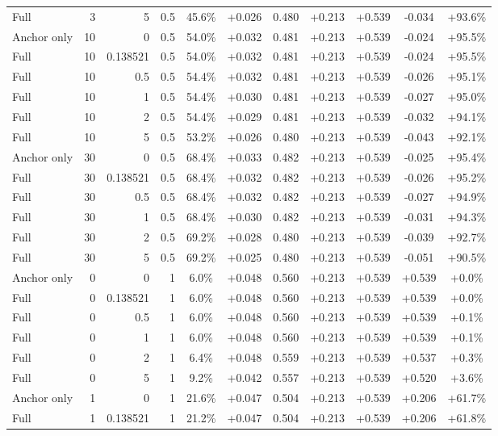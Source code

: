 \begin{table}[htbp]
\begin{tabular}{lrrrccccccc}
Full & 3 & 5 & 0.5 & 45.6\% & +0.026 & 0.480 & +0.213 & +0.539 & -0.034 & +93.6\% \\
Anchor only & 10 & 0 & 0.5 & 54.0\% & +0.032 & 0.481 & +0.213 & +0.539 & -0.024 & +95.5\% \\
Full & 10 & 0.138521 & 0.5 & 54.0\% & +0.032 & 0.481 & +0.213 & +0.539 & -0.024 & +95.5\% \\
Full & 10 & 0.5 & 0.5 & 54.4\% & +0.032 & 0.481 & +0.213 & +0.539 & -0.026 & +95.1\% \\
Full & 10 & 1 & 0.5 & 54.4\% & +0.030 & 0.481 & +0.213 & +0.539 & -0.027 & +95.0\% \\
Full & 10 & 2 & 0.5 & 54.4\% & +0.029 & 0.481 & +0.213 & +0.539 & -0.032 & +94.1\% \\
Full & 10 & 5 & 0.5 & 53.2\% & +0.026 & 0.480 & +0.213 & +0.539 & -0.043 & +92.1\% \\
Anchor only & 30 & 0 & 0.5 & 68.4\% & +0.033 & 0.482 & +0.213 & +0.539 & -0.025 & +95.4\% \\
Full & 30 & 0.138521 & 0.5 & 68.4\% & +0.032 & 0.482 & +0.213 & +0.539 & -0.026 & +95.2\% \\
Full & 30 & 0.5 & 0.5 & 68.4\% & +0.032 & 0.482 & +0.213 & +0.539 & -0.027 & +94.9\% \\
Full & 30 & 1 & 0.5 & 68.4\% & +0.030 & 0.482 & +0.213 & +0.539 & -0.031 & +94.3\% \\
Full & 30 & 2 & 0.5 & 69.2\% & +0.028 & 0.480 & +0.213 & +0.539 & -0.039 & +92.7\% \\
Full & 30 & 5 & 0.5 & 69.2\% & +0.025 & 0.480 & +0.213 & +0.539 & -0.051 & +90.5\% \\
Anchor only & 0 & 0 & 1 & 6.0\% & +0.048 & 0.560 & +0.213 & +0.539 & +0.539 & +0.0\% \\
Full & 0 & 0.138521 & 1 & 6.0\% & +0.048 & 0.560 & +0.213 & +0.539 & +0.539 & +0.0\% \\
Full & 0 & 0.5 & 1 & 6.0\% & +0.048 & 0.560 & +0.213 & +0.539 & +0.539 & +0.1\% \\
Full & 0 & 1 & 1 & 6.0\% & +0.048 & 0.560 & +0.213 & +0.539 & +0.539 & +0.1\% \\
Full & 0 & 2 & 1 & 6.4\% & +0.048 & 0.559 & +0.213 & +0.539 & +0.537 & +0.3\% \\
Full & 0 & 5 & 1 & 9.2\% & +0.042 & 0.557 & +0.213 & +0.539 & +0.520 & +3.6\% \\
Anchor only & 1 & 0 & 1 & 21.6\% & +0.047 & 0.504 & +0.213 & +0.539 & +0.206 & +61.7\% \\
Full & 1 & 0.138521 & 1 & 21.2\% & +0.047 & 0.504 & +0.213 & +0.539 & +0.206 & +61.8\% \\

\end{tabular}
\end{table}
